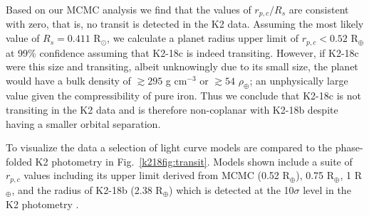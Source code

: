 Based on our MCMC analysis we find that the values of $r_{p,c}/R_s$ are consistent with zero,
that is, no transit is detected in the K2 data.
Assuming the most likely value of $R_s = 0.411$ R$_{\odot}$, 
we calculate a planet radius upper limit of $r_{p,c} < 0.52$ R$_{\oplus}$ at 99\% confidence assuming 
that K2-18c is indeed transiting. However, if K2-18c were this size and  
transiting, albeit unknowingly due to its small size, the planet would have a bulk density
of $\gtrsim 295$ g cm$^{-3}$ or $\gtrsim 54$ $\rho_{\oplus}$; an unphysically large value given
the compressibility of pure iron. Thus
we conclude that K2-18c is not transiting in the K2 data and is therefore non-coplanar with
K2-18b despite having a smaller orbital separation.

To visualize the data a selection of light
curve models are compared to the phase-folded K2 photometry in Fig.~\ref{k218fig:transit}. Models shown
include a suite of $r_{p,c}$ values including its upper limit derived from MCMC (0.52 R$_{\oplus}$),
0.75 R$_{\oplus}$, 1 R$_{\oplus}$, and the radius of K2-18b (2.38 R$_{\oplus}$) which is detected at
the 10$\sigma$ level in the K2 photometry \citep{montet15}. 

